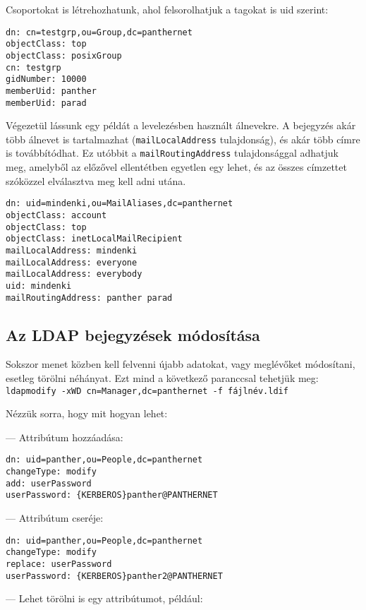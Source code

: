 \noindent Csoportokat is létrehozhatunk, ahol felsorolhatjuk a tagokat is uid szerint:

\begin{Verbatim}[frame=single]
dn: cn=testgrp,ou=Group,dc=panthernet
objectClass: top
objectClass: posixGroup
cn: testgrp
gidNumber: 10000
memberUid: panther
memberUid: parad
\end{Verbatim}


Végezetül lássunk egy példát a levelezésben használt álnevekre. A bejegyzés akár több álnevet is tartalmazhat
(\texttt{mailLocalAddress} tulajdonság), és akár több címre is továbbítódhat. Ez utóbbit a \texttt{mailRoutingAddress}
tulajdonsággal adhatjuk meg, amelyből az előzővel ellentétben egyetlen egy lehet, és az összes címzettet szóközzel
elválasztva meg kell adni utána.

\begin{Verbatim}[frame=single]
dn: uid=mindenki,ou=MailAliases,dc=panthernet
objectClass: account
objectClass: top
objectClass: inetLocalMailRecipient
mailLocalAddress: mindenki
mailLocalAddress: everyone
mailLocalAddress: everybody
uid: mindenki
mailRoutingAddress: panther parad
\end{Verbatim}


\subsection{Az LDAP bejegyzések módosítása}

Sokszor menet közben kell felvenni újabb adatokat, vagy meglévőket módosítani, esetleg törölni néhányat. Ezt mind a
következő paranccsal tehetjük meg:\\
\texttt{ldapmodify -xWD cn=Manager,dc=panthernet -f fájlnév.ldif}

Nézzük sorra, hogy mit hogyan lehet:

\noindent  --- Attribútum hozzáadása:

\begin{Verbatim}[frame=single]
dn: uid=panther,ou=People,dc=panthernet
changeType: modify
add: userPassword
userPassword: {KERBEROS}panther@PANTHERNET
\end{Verbatim}

\noindent --- Attribútum cseréje:
\begin{Verbatim}[frame=single]
dn: uid=panther,ou=People,dc=panthernet
changeType: modify
replace: userPassword
userPassword: {KERBEROS}panther2@PANTHERNET
\end{Verbatim}

\noindent --- Lehet törölni is egy attribútumot, például:

